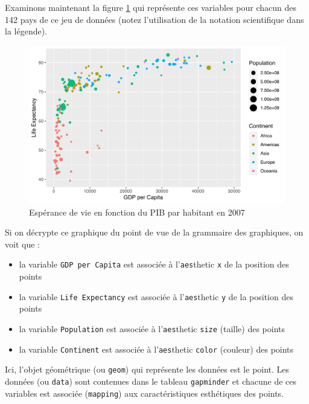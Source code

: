\documentclass[a4paperpaper,]{article}
\providecommand{\tightlist}{%
  \setlength{\itemsep}{0pt}\setlength{\parskip}{0pt}}
\theoremstyle{definition}
\theoremstyle{definition}
\theoremstyle{definition}
\theoremstyle{remark}
\begin{document}
Examinons maintenant la figure \ref{fig:gapmind} qui représente ces
variables pour chacun des 142 pays de ce jeu de données (notez
l'utilisation de la notation scientifique dans la légende).

\begin{figure}[htpb]

{\centering \includegraphics[width=0.9\linewidth]{figure/gapmind-1} 

}

\caption{Espérance de vie en fonction du PIB par habitant en 2007}\label{fig:gapmind}
\end{figure}

Si on décrypte ce graphique du point de vue de la grammaire des
graphiques, on voit que :

\begin{itemize}
\tightlist
\item
  la variable \texttt{GDP\ per\ Capita} est associée à
  l'\texttt{aes}thetic \texttt{x} de la position des points
\item
  la variable \texttt{Life\ Expectancy} est associée à
  l'\texttt{aes}thetic \texttt{y} de la position des points
\item
  la variable \texttt{Population} est associée à l'\texttt{aes}thetic
  \texttt{size} (taille) des points
\item
  la variable \texttt{Continent} est associée à l'\texttt{aes}thetic
  \texttt{color} (couleur) des points
\end{itemize}

Ici, l'objet géométrique (ou \texttt{geom}) qui représente les données
est le point. Les données (ou \texttt{data}) sont contenues dans le
tableau \texttt{gapminder} et chacune de ces variables est associée
(\texttt{mapping}) aux caractéristiques esthétiques des points.
\end{document}
